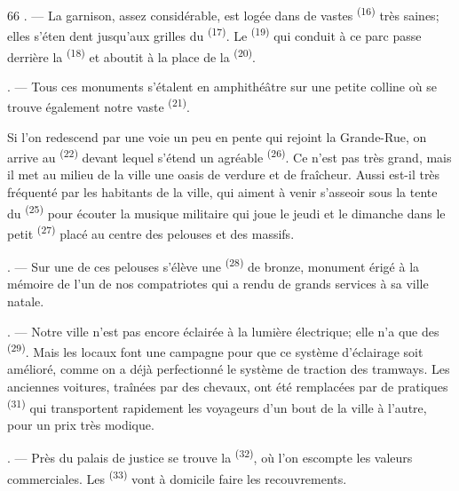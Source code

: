 \begin{VUpage}[68]{66}
. --- La garnison, assez considérable, est logée\nl
dans de vastes \textsuperscript{(16)} très saines; elles s'éten\cc
dent jusqu'aux grilles du \textsuperscript{(17)}. Le\nl
{}\textsuperscript{(19)} qui conduit à ce parc passe derrière la\nl
{}\textsuperscript{(18)} et aboutit à la place de la\nl
{}\textsuperscript{(20)}.

. --- Tous ces monuments s'étalent en amphithéâtre\nl
sur une petite colline où se trouve également notre\nl
vaste \textsuperscript{(21)}.

Si l'on redescend par une voie un peu en pente qui\nl
rejoint la Grande-Rue, on arrive au \cc
{}\textsuperscript{(22)} devant lequel s'étend un agréable \nl
{}\textsuperscript{(26)}. Ce  n'est pas très grand, mais il\nl
met au milieu de la ville une oasis de verdure et de\nl
fraîcheur. Aussi est-il très fréquenté par les habitants\nl
de la ville, qui aiment à venir s'asseoir sous la tente\nl
du \textsuperscript{(25)} pour écouter la musique militaire qui joue\nl
le jeudi et le dimanche dans le petit \textsuperscript{(27)} placé\nl
au centre des pelouses et des massifs.

. --- Sur une de ces pelouses s'élève une \textsuperscript{(28)}\nl
de bronze, monument érigé à la mémoire de l'un de\nl
nos compatriotes qui a rendu de grands services à sa\nl
ville natale.

. --- Notre ville n'est pas encore éclairée à la lumière\nl
électrique; elle n'a que des \textsuperscript{(29)}. Mais\nl
les  locaux font une campagne pour que ce\nl
système d'éclairage soit amélioré, comme on a déjà\nl
perfectionné le système de traction des tramways.\nl
Les anciennes voitures, traînées par des chevaux, ont\nl
été remplacées par de pratiques \cc
{}\textsuperscript{(31)} qui transportent rapidement les voyageurs\nl
d'un bout de la ville à l'autre, pour un prix très\nl
modique.

. --- Près du palais de justice se trouve la \cc
{}\textsuperscript{(32)}, où l'on escompte les valeurs commerciales.\nl
Les \textsuperscript{(33)} vont à domicile faire les\nl
recouvrements.
\end{VUpage}

